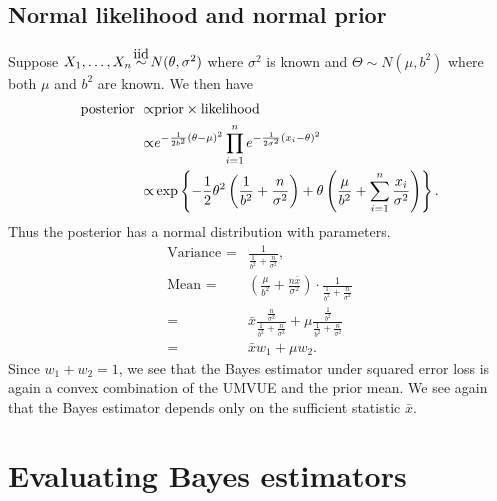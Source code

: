 \subsection{Normal likelihood and normal prior}
Suppose $X_1,\ldots, X_n \iid N(\ta, \sigma^2)$ where $\sigma^2$ is known and $\Theta \sim N(\mu, b^2)$ where both $\mu$ and $b^2$ are known. We then have
\begin{align*}
    \text{posterior }\propto&\text{prior}\times \text{likelihood}\\
    \propto&e^{-\frac{1}{2b^2}({\theta}-\mu)^2}\prod_{i=1}^n e^{-\frac{1}{2\sigma^2}(x_i-{\theta})^2}\\
    \propto&\exp\left\{-\frac{1}{2}{\theta}^2\left(\frac{1}{b^2}+\frac{n}{\sigma^2}\right)+{\theta}\left(\frac{\mu}{b^2}+\sum_{i=1}^n \frac{x_i}{\sigma^2}\right)\right\}.
\end{align*}
Thus the posterior has a normal distribution with parameters.
\begin{align*}
    \text{Variance } =&\frac{1}{\frac{1}{b^2}+\frac{n}{\sigma^2}},\\
    \text{Mean } = & \left(\frac{\mu}{b^2}+\frac{n\bar{x}}{\sigma^2}\right)\cdot \frac{1}{\frac{1}{b^2}+\frac{n}{\sigma^2}}\\
    =&\bar{x} \frac{\frac{n}{\sigma^2}}{\frac{1}{b^2}+\frac{n}{\sigma^2}}+\mu \frac{\frac{1}{b^2}}{\frac{1}{b^2}+\frac{n}{\sigma^2}}\\
    =&\bar{x} w_1 + \mu w_2.
\end{align*}
Since $w_1+w_2=1$, we see that the Bayes estimator under squared error loss is again a convex combination of the UMVUE and the prior mean. We see again that the Bayes estimator depends only on the sufficient statistic $\bar{x}$. 
\section{Evaluating Bayes estimators}

